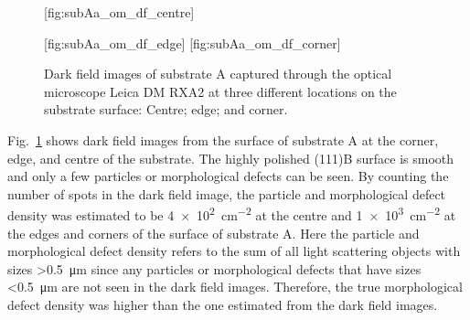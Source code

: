 \begin{figure}[htbp]
    \centering
    [fig:subAa_om_df_centre]
    \par\bigskip
    [fig:subAa_om_df_edge]
    \hfill
    [fig:subAa_om_df_corner]
    \caption[Dark field images of substrate A.]{Dark field images of substrate A captured through the optical microscope Leica DM RXA2 at three different locations on the substrate surface:  Centre;  edge; and  corner.}
    \label{fig:subAa_om_df}
\end{figure}

Fig.~\ref{fig:subAa_om_df} shows dark field images from the surface of substrate A at the corner, edge, and centre of the substrate. The highly polished (111)B surface is smooth and only a few particles or morphological defects can be seen. By counting the number of spots in the dark field image, the particle and morphological defect density was estimated to be \SI{4e2}{\centi\metre^{-2}} at the centre and \SI{1e3}{\centi\metre^{-2}} at the edges and corners of the surface of substrate A. Here the particle and morphological defect density refers to the sum of all light scattering objects with sizes \SI{>0.5}{\micro\metre} since any particles or morphological defects that have sizes \SI{<0.5}{\micro\metre} are not seen in the dark field images. Therefore, the true morphological defect density was higher than the one estimated from the dark field images.

